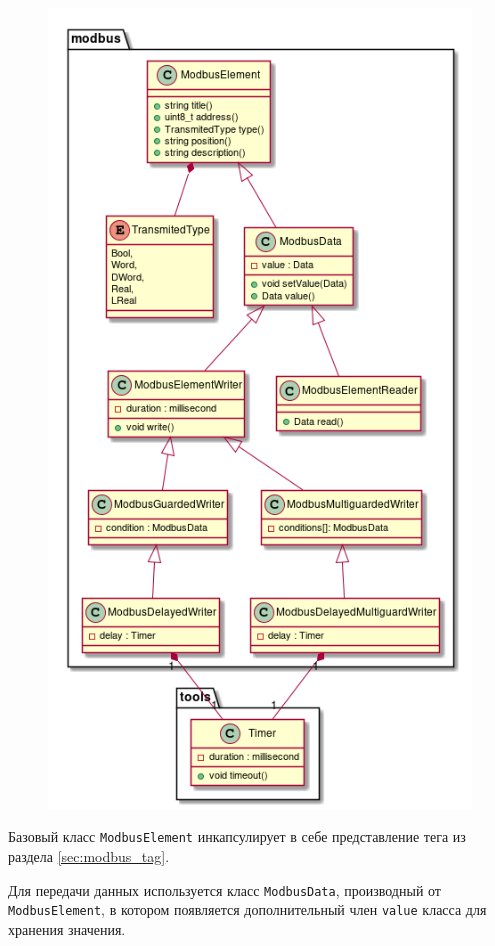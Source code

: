 \begin{center}
    \begin{figure}[h!]
        \includegraphics[height=.7\textheight,width=.8\textwidth,keepaspectratio]{../out/Dissertation/listings/uml/modbus_class_relationship/modbus_class_relationship.png}
        \caption{}\label{sec:fig:modbus_class_uml}
    \end{figure}
\end{center}


Базовый класс \texttt{ModbusElement} инкапсулирует в себе представление тега из раздела \ref{sec:modbus_tag}.

Для передачи данных используется класс \texttt{ModbusData}, производный от \texttt{ModbusElement},
в котором появляется дополнительный член \texttt{value} класса для хранения значения.

